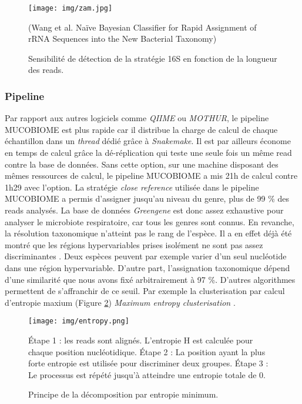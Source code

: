 \documentclass[12pt,a4paper]{article}
\begin{document}
\begin{figure}[H]
\begin{center}
\texttt{[image: img/zam.jpg]}\hfill
\caption{Sensibilité de détection de la stratégie 16S en fonction de la longueur des reads.} (Wang et al. Naïve Bayesian Classifier for Rapid Assignment of rRNA Sequences into the New Bacterial Taxonomy)
\label{rnasens}
\end{center}
\end{figure}

\subsubsection{Pipeline}
Par rapport aux autres logiciels comme \textit{QIIME}\cite{Caporaso2010} ou \textit{MOTHUR}\cite{Schloss2009}, le pipeline MUCOBIOME est  plus rapide car il distribue la charge de calcul de chaque échantillon dans un \textit{thread} dédié grâce à \textit{Snakemake}\cite{Koster2012}. Il est par ailleurs économe en temps de calcul grâce la dé-réplication qui teste une seule fois un même read contre la base de données. Sans cette option, sur une machine disposant des mêmes ressources de calcul, le pipeline MUCOBIOME a mis 21h de calcul contre 1h29 avec l'option.
La stratégie \textit{close reference} utilisée dans le pipeline MUCOBIOME a permis d'assigner jusqu'au niveau du genre, plus de 99 \% des reads analysés. La base de données \textit{Greengene} est donc assez exhaustive pour analyser le microbiote respiratoire, car tous les genres sont connus.
En revanche, la résolution taxonomique n'atteint pas le rang de l'espèce. Il a en effet déjà été montré que les régions hypervariables prises isolément ne sont pas assez discriminantes \cite{Yang2016}. Deux espèces peuvent par exemple varier d'un seul nucléotide dans une région hypervariable.
D'autre part, l'assignation taxonomique dépend d'une similarité que nous avons fixé arbitrairement à 97 \%. D'autres algorithmes permettent de s'affranchir de ce seuil. Par exemple la clusterisation par calcul d'entropie maxium (Figure \ref{entropy}) \textit{Maximum entropy clusterisation} \cite{Bobadilla2015}.


\begin{figure}
\begin{center}
\texttt{[image: img/entropy.png]}\hfill
\end{center}
\caption{Principe de la décomposition par entropie minimum\cite{Bobadilla2015}.} Étape 1 : les reads sont alignés. L'entropie H est calculée pour chaque position nucléotidique. Étape 2 : La position ayant la plus forte entropie est utilisée pour discriminer deux groupes. Étape 3 : Le processus est répété jusqu'à atteindre une entropie totale de 0.
\label{entropy}
\end{figure}
\end{document}
